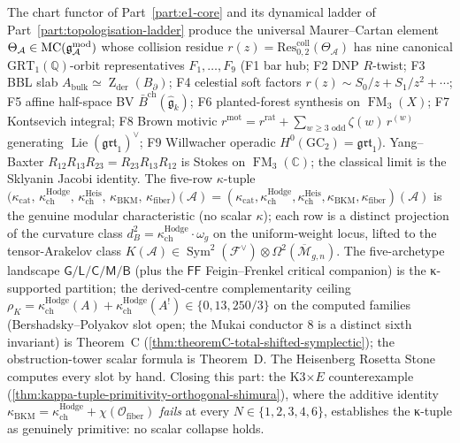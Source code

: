\documentclass[11pt]{memoir}
\DeclareMathOperator{\FM}{FM}
\providecommand{\gAmod}{\mathfrak{g}_{\cA}^{\mathrm{mod}}}
\providecommand{\cref}[1]{\ref{#1}}
\newcommand{\cO}{\mathcal{O}}
\newcommand{\cA}{\mathcal{A}}
\newcommand{\C}{\mathbb{C}}
\newcommand{\Q}{\mathbb{Q}}
\providecommand{\cF}{\mathcal{F}}
\providecommand{\cM}{\mathcal{M}}
\providecommand{\fg}{\mathfrak{g}}
\providecommand{\cM}{\mathcal{M}}
\providecommand{\Zder}{\operatorname{Z}_{\mathrm{der}}}
\providecommand{\Abulk}{A_{\mathrm{bulk}}}
\providecommand{\Bbound}{B_{\partial}}
\newcommand{\barB}{\bar{B}}
\providecommand{\kappaCat}{\kappa_{\mathrm{cat}}}
\providecommand{\kappaChHodge}{\kappa_{\mathrm{ch}}^{\mathrm{Hodge}}}
\providecommand{\kappaChHeis}{\kappa_{\mathrm{ch}}^{\mathrm{Heis}}}
\providecommand{\kappaBKM}{\kappa_{\mathrm{BKM}}}
\providecommand{\kappaFiber}{\kappa_{\mathrm{fiber}}}
\providecommand{\kappaTuple}[1]{\bigl(\kappaCat,\, \kappaChHodge,\, \kappaChHeis,\, \kappaBKM,\, \kappaFiber\bigr)(#1)}
\begin{document}
\noindent
The chart functor of Part~\ref{part:e1-core} and its dynamical
ladder of Part~\ref{part:topologisation-ladder} produce the
universal Maurer--Cartan element
$\Theta_\cA \in \mc(\gAmod)$ whose collision residue
$r(z) = \mathrm{Res}^{\mathrm{coll}}_{0,2}(\Theta_\cA)$ has nine
canonical $\mathrm{GRT}_1(\Q)$-orbit representatives
$F_1, \ldots, F_9$ \textup(F1 bar hub; F2 DNP $R$-twist;
F3 BBL slab $\Abulk \simeq \Zder(\Bbound)$; F4 celestial soft
factors $r(z) \sim S_0/z + S_1/z^2 + \cdots$; F5 affine
half-space BV $\barB^{\mathrm{ch}}(\widehat{\fg}_k)$; F6
planted-forest synthesis on $\FM_3(X)$; F7 Kontsevich integral;
F8 Brown motivic $r^{\mathrm{mot}} = r^{\mathrm{rat}} +
\sum_{w \ge 3 \text{ odd}} \zeta(w)\,r^{(w)}$ generating
$\operatorname{Lie}(\mathfrak{grt}_1)^\vee$; F9 Willwacher operadic
$H^0(\mathrm{GC}_2) = \mathfrak{grt}_1$\textup). Yang--Baxter
$R_{12} R_{13} R_{23} = R_{23} R_{13} R_{12}$ is Stokes on
$\FM_3(\C)$; the classical limit is the Sklyanin Jacobi identity.
The five-row $\kappa$-tuple
$\kappaTuple{\cA} =
(\kappaCat, \kappaChHodge, \kappaChHeis, \kappaBKM, \kappaFiber)(\cA)$
is the genuine modular characteristic
\textup(no scalar $\kappa$\textup); each row is a distinct
projection of the curvature class
$d_B^2 = \kappaChHodge \cdot \omega_g$ on the uniform-weight locus,
lifted to the tensor-Arakelov class
$K(\cA) \in \operatorname{Sym}^2(\cF^\vee) \otimes
\Omega^2(\overline{\cM}_{g,n})$. The five-archetype landscape
$\mathsf{G/L/C/M/B}$ \textup(plus the $\mathsf{FF}$ Feigin--Frenkel
critical companion\textup) is the κ-supported partition; the
derived-centre complementarity ceiling
$\rho_K = \kappaChHodge(A) + \kappaChHodge(A^!) \in
\{0, 13, 250/3\}$ on the computed families (Bershadsky--Polyakov
slot open; the Mukai conductor $8$ is a distinct sixth invariant)
is Theorem~C
\textup(\cref{thm:theoremC-total-shifted-symplectic}\textup);
the obstruction-tower scalar formula is Theorem~D. The Heisenberg
Rosetta Stone computes every slot by hand. Closing this part:
the K3$\times E$ counterexample
\textup(\cref{thm:kappa-tuple-primitivity-orthogonal-shimura}\textup),
where the additive identity
$\kappaBKM = \kappaChHodge + \chi(\cO_{\mathrm{fiber}})$ \emph{fails}
at every $N \in \{1, 2, 3, 4, 6\}$, establishes the κ-tuple as
genuinely primitive: no scalar collapse holds.
\end{document}
